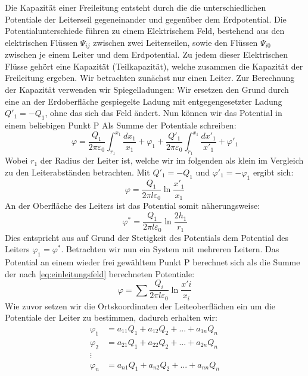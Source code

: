  Die Kapazität einer Freileitung entsteht durch die die unterschiedlichen Potentiale der Leiterseil gegeneinander und gegenüber dem Erdpotential. Die Potentialunterschiede führen zu einem Elektrischem Feld, bestehend aus den elektrischen Flüssen $\Psi_{ij}$ zwischen zwei Leiterseilen, sowie den Flüssen $\Psi_{i0}$ zwischen je einem Leiter und dem Erdpotential. Zu jedem dieser Elektrischen Flüsse gehört eine Kapazität (Teilkapazität), welche zusammen die Kapazität der Freileitung ergeben.
Wir betrachten zunächst nur einen Leiter. Zur Berechnung der Kapazität verwenden wir Spiegelladungen: Wir ersetzen den Grund durch eine an der Erdoberfläche gespiegelte Ladung mit entgegengesetzter Ladung $Q'_1 = - Q_1$, ohne das sich das Feld ändert. Nun können wir das Potential in einem beliebigen Punkt P Als Summe der Potentiale schreiben:
\begin{equation}
\varphi = \frac{Q_1}{2\pi\varepsilon_0} \int^{x_1}_{r_1} \frac{dx_1}{x_1} + \varphi_1 + \frac{Q'_1}{2\pi\varepsilon_0} \int^{x_1}_{r_1} \frac{dx'_1}{x'_1} + \varphi'_1
\end{equation}
Wobei $r_1$ der Radius der Leiter ist, welche wir im folgenden als klein im Vergleich zu den Leiterabständen betrachten. Mit $Q'_1 = - Q_1$ und $\varphi'_1 = - \varphi_1$ ergibt sich:
\begin{equation}\label{eq:einleitungsfeld}
\varphi = \frac{Q_1}{2\pi l\varepsilon_0} \ln \frac{x'_1}{x_1}
\end{equation}
An der Oberfläche des Leiters ist das Potential somit näherungsweise:
\begin{equation}
\varphi^* = \frac{Q_1}{2\pi l\varepsilon_0} \ln \frac{2h_1}{r_1}
\end{equation}
Dies entspricht aus auf Grund der Stetigkeit des Potentials %
dem Potential des Leiters $\varphi_1 = \varphi^*$.
Betrachten wir nun ein System mit mehreren Leitern. Das Potential an einem wieder frei gewähltem Punkt P berechnet sich als die Summe der nach \eqref{eq:einleitungsfeld} berechneten Potentiale:
\begin{equation}
\varphi = \sum \frac{Q_i}{2\pi l\varepsilon_0} \ln \frac{x'i}{x_i}
\end{equation}
Wie zuvor setzen wir die Ortskoordinaten der Leiteoberflächen ein um die Potentiale der Leiter zu bestimmen, dadurch erhalten wir:
\begin{align}
\varphi_1 &= a_{11} Q_1 + a_{12} Q_{2} + ... + a_{1n} Q_n \\
\varphi_2 &= a_{21} Q_1 + a_{22} Q_{2} + ... + a_{2n} Q_n \\
\vdots \\
\varphi_n &= a_{n1} Q_1 + a_{n2} Q_{2} + ... + a_{nn} Q_n
\end{align}
